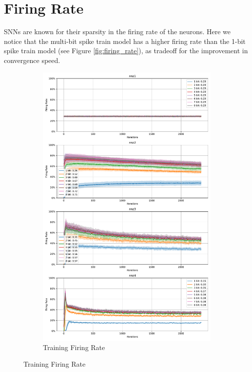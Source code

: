     \section{Firing Rate}
    \label{sec:firing-rate}
        SNNs are known for their sparsity in the firing rate of the neurons. Here we notice that the multi-bit spike train model has a higher firing rate than the 1-bit spike train model (see Figure \ref{fig:firing_rate}), as tradeoff for the improvement in convergence speed. 
        \begin{figure}[!htpb]
            \centering
            \begin{subfigure}[H]{0.9\textwidth}
                \centering
                \includegraphics[width=\textwidth]{../standard/FashionMNIST/plots/fashionmnist_train_firerate.pdf}
                \caption{Training Firing Rate}
            \end{subfigure}
        \end{figure}
